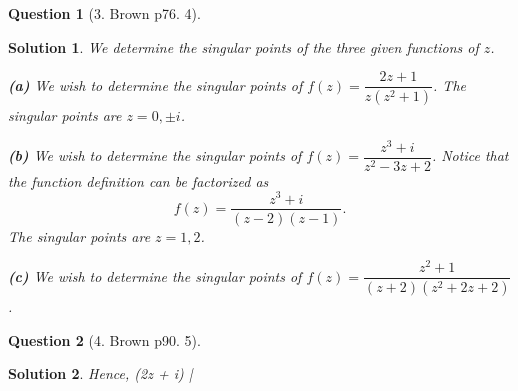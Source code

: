 \documentclass{article} %
\def\eQb#1\eQe{\begin{eqnarray*}#1\end{eqnarray*}}
\theoremstyle{quest}
\newtheorem*{question}{Question}
\newtheorem*{solution}{Solution}
\begin{document}
\bigskip

\begin{question}[3. Brown p76. 4]
\end{question}
\begin{solution}
We determine the singular points of the three given functions of $z$.

\smallskip

\textbf{(a)} We wish to determine the singular points of $f(z) = \dfrac{2z + 1}{z(z^2+1)}$.
The singular points are $z = 0, \pm i$.
\smallskip

\textbf{(b)} We wish to determine the singular points of $f(z) = \dfrac{z^3 + i}{z^2 - 3z + 2}$.
Notice that the function definition can be factorized as
\[
f(z) = \dfrac{z^3 + i}{(z-2)(z-1)}.
\]
The singular points are $z = 1,2$.
\smallskip

\textbf{(c)} We wish to determine the singular points of $f(z) = \dfrac{z^2 + 1}{(z+2)
(z^2 + 2z + 2)}$.


\end{solution}

\bigskip

\begin{question}[4. Brown p90. 5]
\end{question}
\begin{solution}
Hence,
\eQb
| (2z + i) |
\eQe
\end{solution}

\pagebreak
\end{document}
